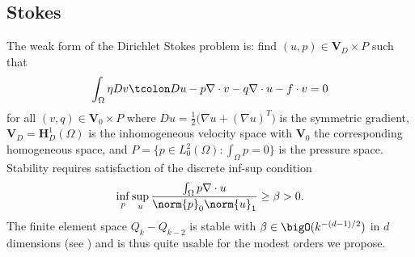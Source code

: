 \subsection{Stokes}
The weak form of the Dirichlet Stokes problem is: find $(u,p) \in \bm V_D \times P$ such that
\begin{equation*}
  \int_\Omega \eta Dv \tcolon Du - p \nabla\cdot v - q\nabla\cdot u - f\cdot v = 0
\end{equation*}
for all $(v,q) \in \bm V_0 \times P$ where $Du = \frac 1 2 \big(\nabla u + (\nabla u)^T \big)$ is the symmetric
gradient, $\bm V_D = \bm H^1_D(\Omega)$ is the inhomogeneous velocity space with $\bm V_0$ the corresponding homogeneous
space, and $P = \{p \in L^2_0(\Omega) : \int_\Omega p = 0 \}$ is the pressure space.  Stability requires satisfaction of
the discrete inf-sup condition
\begin{equation*}
  \inf_{p} \sup_{u} \frac{\int_\Omega p \nabla \cdot u}{\norm{p}_{0} \norm{u}_1} \ge \beta > 0 .
\end{equation*}
The finite element space $Q_k-Q_{k-2}$ is stable with $\beta \in \bigO(k^{-(d-1)/2})$ in $d$ dimensions (see
\cite{schotzau1998mhf}) and is thus quite usable for the modest orders we propose.


